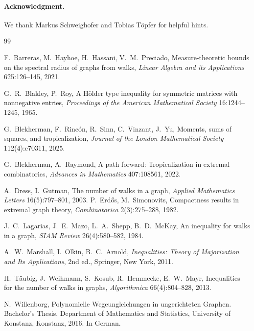 \documentclass[11pt]{article}
\theoremstyle{remark}
\begin{document}
\paragraph{Acknowledgment.}
We thank Markus Schweighofer and Tobias T\"opfer for helpful hints.



\begin{thebibliography}{99}
\small

F.~Barreras, M.~Hayhoe, H.~Hassani, V.~M.~Preciado,
\newblock Measure-theoretic bounds on the spectral radius of graphs from walks,
\newblock \emph{Linear Algebra and its Applications} 625:126--145, 2021.

G.~R.~Blakley, P.~Roy,
\newblock A H\"older type inequality for symmetric matrices with nonnegative entries,
\newblock \emph{Proceedings of the American Mathematical Society} 16:1244--1245, 1965.

G.~Blekherman, F.~Rinc\'on, R.~Sinn, C.~Vinzant, J.~Yu,
\newblock Moments, sums of squares, and tropicalization,
\newblock \emph{Journal of the London Mathematical Society} 112(4):e70311, 2025.

G.~Blekherman, A.~Raymond,
\newblock A path forward: Tropicalization in extremal combinatorics,
\newblock \emph{Advances in Mathematics} 407:108561, 2022.

A.~Dress, I.~Gutman,
\newblock The number of walks in a graph,
\newblock \emph{Applied Mathematics Letters} 16(5):797--801, 2003.
P.~Erd\H{o}s, M.~Simonovits,
\newblock Compactness results in extremal graph theory,
\newblock \emph{Combinatorica} 2(3):275--288, 1982.

J.~C.~Lagarias, J.~E.~Mazo, L.~A.~Shepp, B.~D.~McKay,
\newblock An inequality for walks in a graph,
\newblock \emph{SIAM Review} 26(4):580--582, 1984.

A.~W.~Marshall, I.~Olkin, B.~C.~Arnold,
\newblock \emph{Inequalities: Theory of Majorization and Its Applications}, 2nd ed.,
\newblock Springer, New York, 2011.

H.~T\"aubig, J.~Weihmann, S.~Kosub, R.~Hemmecke, E.~W.~Mayr,
\newblock Inequalities for the number of walks in graphs,
\newblock \emph{Algorithmica} 66(4):804--828, 2013.

N.~Willenborg,
\newblock Polynomielle Wegeungleichungen in ungerichteten Graphen.
\newblock Bachelor's Thesis, Department of Mathematics and Statistics, University of Konstanz, Konstanz, 2016. In German.

\end{thebibliography}
\end{document}
